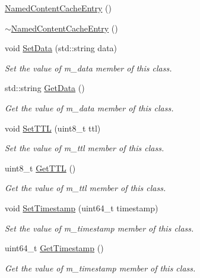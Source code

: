 \begin{DoxyCompactItemize}
\item 
\hyperlink{classns3_1_1NamedContentCacheEntry_a294cbb286019c6a3de5b6f8ad71c015f}{Named\-Content\-Cache\-Entry} ()
\item 
\hyperlink{classns3_1_1NamedContentCacheEntry_ae9cda1925e97d4515fa1ad2b4de6d66c}{$\sim$\-Named\-Content\-Cache\-Entry} ()
\item 
void \hyperlink{classns3_1_1NamedContentCacheEntry_aa4cbf8caa8556e0afec4277a726098ed}{Set\-Data} (std\-::string data)
\begin{DoxyCompactList}\small\item\em Set the value of m\-\_\-data member of this class. \end{DoxyCompactList}\item 
std\-::string \hyperlink{classns3_1_1NamedContentCacheEntry_ae4f12a25a56930539db943e716727fee}{Get\-Data} ()
\begin{DoxyCompactList}\small\item\em Get the value of m\-\_\-data member of this class. \end{DoxyCompactList}\item 
void \hyperlink{classns3_1_1NamedContentCacheEntry_a04f177d7a9fd804cb198b7f72985da67}{Set\-T\-T\-L} (uint8\-\_\-t ttl)
\begin{DoxyCompactList}\small\item\em Set the value of m\-\_\-ttl member of this class. \end{DoxyCompactList}\item 
uint8\-\_\-t \hyperlink{classns3_1_1NamedContentCacheEntry_af1d9ecd88947458bb8ccb61b4691ef21}{Get\-T\-T\-L} ()
\begin{DoxyCompactList}\small\item\em Get the value of m\-\_\-ttl member of this class. \end{DoxyCompactList}\item 
void \hyperlink{classns3_1_1NamedContentCacheEntry_ac69fe94ee364c65873a5e12b7deaaf29}{Set\-Timestamp} (uint64\-\_\-t timestamp)
\begin{DoxyCompactList}\small\item\em Set the value of m\-\_\-timestamp member of this class. \end{DoxyCompactList}\item 
uint64\-\_\-t \hyperlink{classns3_1_1NamedContentCacheEntry_ac04323c50252406ed5b7931f874a55af}{Get\-Timestamp} ()
\begin{DoxyCompactList}\small\item\em Get the value of m\-\_\-timestamp member of this class. \end{DoxyCompactList}\item 

\end{DoxyCompactItemize}
